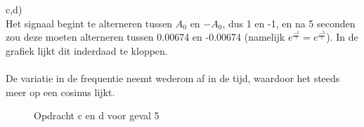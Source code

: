 \documentclass{article}
\begin{document}
c,d)\\
Het signaal begint te alterneren tussen $A_0$ en $-A_0$, dus 1 en -1, en na 5
seconden zou deze moeten alterneren tussen 0.00674 en -0.00674 (namelijk
$e^\frac{-t}{\tau} = e^\frac{-5}{1}$). In de grafiek lijkt dit inderdaad te
kloppen.\\
\\
De variatie in de frequentie neemt wederom af in de tijd, waardoor het steeds meer op een cosinus lijkt.
\begin{figure}[h]
  \centering
  \caption{Opdracht c en d voor geval 5}
  \label{fig:case1b}
\end{figure}
\end{document}
